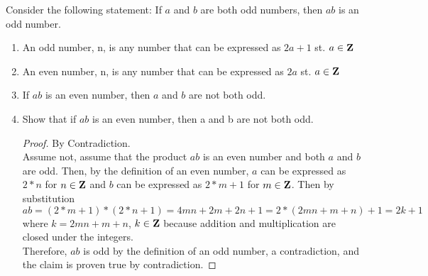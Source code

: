 \documentclass{article}
\begin{document}
\nextprob
Consider the following statement: If $a$ and $b$ are both odd numbers, then $ab$ is
an odd number.
\begin{enumerate}
    \item An odd number, n, is any number that can be expressed as $2a + 1$ st. $a \in \mathbf{Z}$
    \item An even number, n, is any number that can be expressed as $2a$ st. $a \in \mathbf{Z}$
    \item If $ab$ is an even number, then $a$ and $b$ are not both odd.
    \item Show that if $ab$ is an even number, then a and b are not both odd.
    	
    	\begin{proof} By Contradiction. \\
Assume not, assume that the product $ab$ is an even number and both $a$ and $b$ are odd. Then, by the definition of an even number, $a$ can be expressed as $2*n$ for $n \in \mathbf{Z}$ and $b$ can be expressed as $2*m + 1$ for $m \in \mathbf{Z}$. Then by substitution $ab = (2*m + 1) * (2*n + 1) = 4mn + 2m + 2n + 1 = 2 *(2mn + m + n) + 1 = 2k + 1$ where $k = 2mn + m + n$, $k \in \mathbf{Z}$ because addition and multiplication are closed under the integers. \\
Therefore, $ab$ is odd by the definition of an odd number, a contradiction, and the claim is proven true by contradiction.
    	\end{proof}
    	
\end{enumerate}
\end{document}
